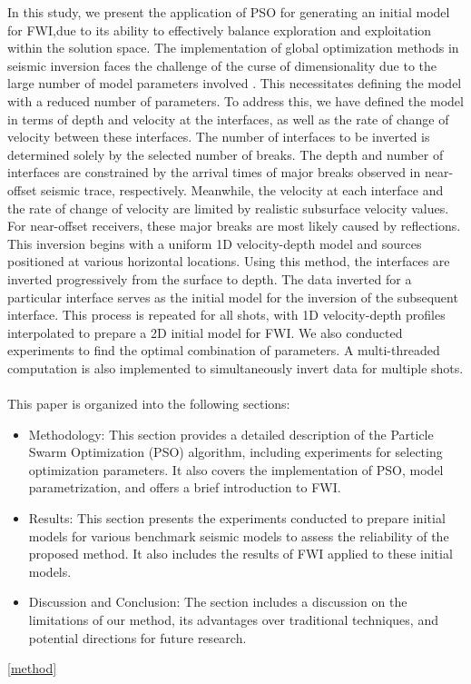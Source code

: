 \documentclass[paper,revised]{geophysics}
\begin{document}
\par
In this study, we present the application of PSO for generating an initial model for FWI,due to its ability to effectively balance exploration and exploitation within the solution space. The implementation of global optimization methods in seismic inversion faces the challenge of the curse of dimensionality due to the large number of model parameters involved \citep{nirmit2024}. This necessitates defining the model with a reduced number of parameters. To address this, we have defined the model in terms of depth and velocity at the interfaces, as well as the rate of change of velocity between these interfaces. The number of interfaces to be inverted is determined solely by the selected number of breaks. The depth and number of interfaces are constrained by the arrival times of major breaks observed in near-offset seismic trace, respectively. Meanwhile, the velocity at each interface and the rate of change of velocity are limited by realistic subsurface velocity values. For near-offset receivers, these major breaks are most likely caused by reflections. This inversion begins with a uniform 1D velocity-depth model and sources positioned at various horizontal locations. Using this method, the interfaces are inverted progressively from the surface to depth. The data inverted for a particular interface serves as the initial model for the inversion of the subsequent interface. This process is repeated for all shots, with 1D velocity-depth profiles interpolated to prepare a 2D initial model for FWI. We also conducted experiments to find the optimal combination of parameters. A multi-threaded computation is also implemented to simultaneously invert data for multiple shots.
\\
\\
This paper is organized into the following sections:
\begin{itemize}
	\item Methodology: This section provides a detailed description of the Particle Swarm Optimization (PSO) algorithm, including experiments for selecting optimization parameters. It also covers the implementation of PSO, model parametrization, and offers a brief introduction to FWI.
	\item Results: This section presents the experiments conducted to prepare initial models for various benchmark seismic models to assess the reliability of the proposed method. It also includes the results of FWI applied to these initial models.
	\item Discussion and Conclusion: The section includes a discussion on the limitations of our method, its advantages over traditional techniques, and potential directions for future research.
\end{itemize}
\ref{method}
\end{document}
